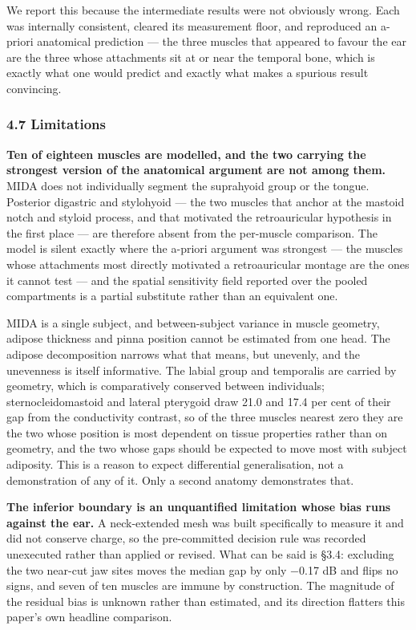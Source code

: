 \documentclass[
  11pt,
]{article}
\begin{document}
We report this because the intermediate results were not obviously wrong. Each
was internally consistent, cleared its measurement floor, and reproduced an
a-priori anatomical prediction --- the three muscles that appeared to favour the
ear are the three whose attachments sit at or near the temporal bone, which is
exactly what one would predict and exactly what makes a spurious result
convincing.

\subsubsection{4.7 Limitations}\label{limitations}

\textbf{Ten of eighteen muscles are modelled, and the two carrying the strongest
version of the anatomical argument are not among them.} MIDA does not
individually segment the suprahyoid group or the tongue. Posterior digastric and
stylohyoid --- the two muscles that anchor at the mastoid notch and styloid
process, and that motivated the retroauricular hypothesis in the first place ---
are therefore absent from the per-muscle comparison. The model is silent exactly
where the a-priori argument was strongest --- the muscles whose attachments most
directly motivated a retroauricular montage are the ones it cannot test --- and the
spatial
sensitivity field reported over the pooled compartments is a partial substitute
rather than an equivalent one.

MIDA is a single subject, and between-subject variance in muscle geometry,
adipose thickness and pinna position cannot be estimated from one head. The
adipose decomposition narrows what that means, but unevenly, and the unevenness
is itself informative. The labial group and temporalis are carried by geometry,
which is comparatively conserved between individuals; sternocleidomastoid and
lateral pterygoid draw 21.0 and 17.4 per cent of their gap from the
conductivity contrast, so of the three muscles nearest zero they are the two
whose position is most dependent on tissue properties rather than on geometry,
and the two whose gaps should be expected to move most with subject adiposity. This is a reason to expect
differential generalisation, not a demonstration of any of it. Only a second
anatomy demonstrates that.

\textbf{The inferior boundary is an unquantified limitation whose bias runs against
the ear.} A neck-extended mesh was built specifically to measure it and did not
conserve charge, so the pre-committed decision rule was recorded unexecuted
rather than applied or revised. What can be said is §3.4: excluding the two
near-cut jaw sites moves the median gap by only −0.17 dB and flips no signs, and
seven of ten muscles are immune by construction. The magnitude of the residual
bias is unknown rather than estimated, and its direction flatters this paper's
own headline comparison.
\end{document}
